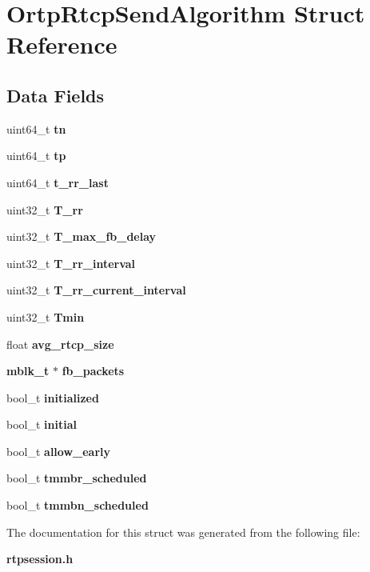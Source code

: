 \section{Ortp\+Rtcp\+Send\+Algorithm Struct Reference}
\label{structOrtpRtcpSendAlgorithm}
\subsection*{Data Fields}
\begin{DoxyCompactItemize}
\item 
\mbox{\label{structOrtpRtcpSendAlgorithm_ad993da2e99cffa3e767d906c1aa46c42}} 
uint64\+\_\+t {\bfseries tn}
\item 
\mbox{\label{structOrtpRtcpSendAlgorithm_a5878e1519be28d81ade92c633450e69e}} 
uint64\+\_\+t {\bfseries tp}
\item 
\mbox{\label{structOrtpRtcpSendAlgorithm_a26af39b31b3efe5ccd84410939c098bf}} 
uint64\+\_\+t {\bfseries t\+\_\+rr\+\_\+last}
\item 
\mbox{\label{structOrtpRtcpSendAlgorithm_aaaff0fbdec852ec705ada379c12ec2b3}} 
uint32\+\_\+t {\bfseries T\+\_\+rr}
\item 
\mbox{\label{structOrtpRtcpSendAlgorithm_ab40e8cbe524826a8f923d390c0bd68de}} 
uint32\+\_\+t {\bfseries T\+\_\+max\+\_\+fb\+\_\+delay}
\item 
\mbox{\label{structOrtpRtcpSendAlgorithm_ad0122ad1665e7c331e82519cf1da05bf}} 
uint32\+\_\+t {\bfseries T\+\_\+rr\+\_\+interval}
\item 
\mbox{\label{structOrtpRtcpSendAlgorithm_a283dd1f9d9b2828981ea21d258190eea}} 
uint32\+\_\+t {\bfseries T\+\_\+rr\+\_\+current\+\_\+interval}
\item 
\mbox{\label{structOrtpRtcpSendAlgorithm_affb1a7f1036759f325e935201d79455e}} 
uint32\+\_\+t {\bfseries Tmin}
\item 
\mbox{\label{structOrtpRtcpSendAlgorithm_a9d3c6d3f92e07bf5c0d267c6566caf5a}} 
float {\bfseries avg\+\_\+rtcp\+\_\+size}
\item 
\mbox{\label{structOrtpRtcpSendAlgorithm_a74348ab918d6585b2a766e68bb0dd123}} 
\textbf{ mblk\+\_\+t} $\ast$ {\bfseries fb\+\_\+packets}
\item 
\mbox{\label{structOrtpRtcpSendAlgorithm_a3d58fbc1a10d5d6ebb9edc736759df57}} 
bool\+\_\+t {\bfseries initialized}
\item 
\mbox{\label{structOrtpRtcpSendAlgorithm_a00c9d4340af429afcd605faf960a3508}} 
bool\+\_\+t {\bfseries initial}
\item 
\mbox{\label{structOrtpRtcpSendAlgorithm_a3df6c4dfab47b3903e78a0def1cf51d9}} 
bool\+\_\+t {\bfseries allow\+\_\+early}
\item 
\mbox{\label{structOrtpRtcpSendAlgorithm_ae77bd3f108a238e1f367f75f3ffc3d79}} 
bool\+\_\+t {\bfseries tmmbr\+\_\+scheduled}
\item 
\mbox{\label{structOrtpRtcpSendAlgorithm_a4ebbc514900351dac6541940efb02239}} 
bool\+\_\+t {\bfseries tmmbn\+\_\+scheduled}
\end{DoxyCompactItemize}


The documentation for this struct was generated from the following file\+:\begin{DoxyCompactItemize}
\item 
\textbf{ rtpsession.\+h}\end{DoxyCompactItemize}
